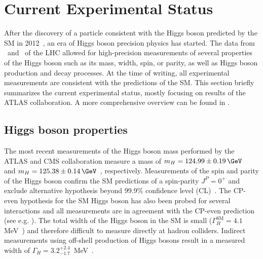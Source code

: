\section{Current Experimental Status}
\label{subsec:higgs-exp-status}
After the discovery of a particle consistent with the Higgs boson predicted by the SM in 2012~\cite{HIGG-2012-27,CMS-HIG-12-028}, an era of Higgs boson precision physics has started.
The data from \RunOne\ and \RunTwo\ of the LHC allowed for high-precision measurements of several properties of the Higgs boson such as its mass, width, spin, or parity, as well as Higgs boson production and decay processes. 
At the time of writing, all experimental measurements are consistent with the predictions of the SM.
This section briefly summarizes the current experimental status, mostly focusing on results of the ATLAS collaboration.
A more comprehensive overview can be found in . 

\subsection{Higgs boson properties}
The most recent measurements of the Higgs boson mass performed by the ATLAS and CMS collaboration measure a mass of $m_H = 124.99 \pm 0.19\,\GeV$~\cite{https://doi.org/10.48550/arxiv.2207.00320} and $m_H = 125.38 \pm 0.14\,\GeV$~\cite{CMS-HIG-19-004}, respectively.
Measurements of the spin and parity of the Higgs boson confirm the SM predictions of a spin-parity $J^{P} = 0^{+}$ and exclude alternative hypothesis beyond 99.9\% confidence level (CL)~\cite{HIGG-2013-17-witherratum,CMS-HIG-14-018}.
The CP-even hypothesis for the SM Higgs boson has also been probed for several interactions and all measurements are in agreement with the CP-even prediction (see e.g. ).
The total width of the Higgs boson in the SM is small ($\Gamma_H^{\text{SM}} = 4.1\,$ MeV~\cite{deFlorian:2016spz}) and therefore difficult to measure directly at hadron colliders. Indirect measurements using off-shell production of Higgs bosons result in a measured width of $\Gamma_H = 3.2 ^{+2.4}_{-1.7}\,$ MeV~\cite{https://doi.org/10.48550/arxiv.2202.06923}.

